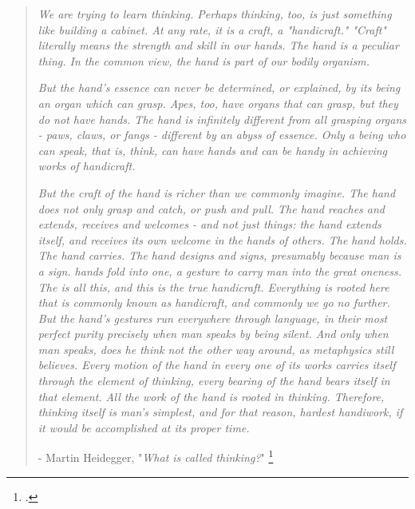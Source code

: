 \begin{quotation}
\textit{We are trying to learn thinking. Perhaps thinking, too, is just something like building a cabinet. At any rate, it is a craft, a "handicraft." "Craft" literally means the strength and skill in our hands. The hand is a peculiar thing. In the common view, the hand is part of our bodily organism.}

\textit{But the hand's essence can never be determined, or explained, by its being an organ which can grasp. Apes, too, have organs that can grasp, but they do not have hands. The hand is infinitely different from all grasping organs - paws, claws, or fangs - different by an abyss of essence. Only a being who can speak, that is, think, can have hands and can be handy in achieving works of handicraft. }

\textit{But the craft of the hand is richer than we commonly imagine. The hand does not only grasp and catch, or push and pull. The hand reaches and extends, receives and welcomes - and not just things: the hand extends itself, and receives its own welcome in the hands of others. The hand holds. The hand carries. The hand designs and signs, presumably because man is a sign. hands fold into one, a gesture to carry man into the great oneness. The is all this, and this is the true handicraft. Everything is rooted here that is commonly known as handicraft, and commonly we go no further. But the hand's gestures run everywhere through language, in their most perfect purity precisely when man speaks by being silent. And only when man speaks, does he think not the other way around, as metaphysics still believes. Every motion of the hand in every one of its works carries itself through the element of thinking, every bearing of the hand bears itself in that element. All the work of the hand is rooted in thinking. Therefore, thinking itself is man's simplest, and for that reason, hardest handiwork, if it would be accomplished at its proper time.}
\\

\begin{flushright}
- Martin Heidegger, "\textit{What is called thinking?}" \footcite{Heidegger1968}
\end{flushright}
\end{quotation}